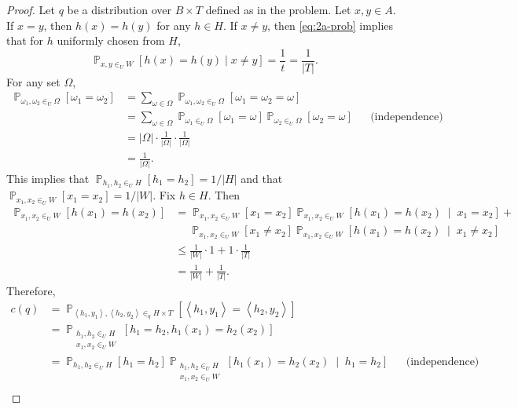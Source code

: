 \documentclass[letterpaper, reqno,11pt]{article}
\newcommand{\PP}{\mathop{{}\mathbb{P}}}
\begin{document}
\begin{enumerate}
\begin{enumerate}
    \begin{proof}
      Let $q$ be a distribution over $B \times T$ defined as in the problem. Let $x, y \in A$. If $x = y$, then $h(x) = h(y)$ for any $h \in H$. If $x \neq y$, then \eqref{eq:2a-prob} implies that for $h$ uniformly chosen from $H$,
      $$ \PP_{x, y \in_U W}[h(x) = h(y) \mid x \neq y] = \frac{1}{t} = \frac{1}{|T|}. $$
      For any set $\Omega$,
      \begin{align*}
        \PP_{\omega_1, \omega_2 \in_U \Omega}\left[\omega_1 = \omega_2\right] &= \sum_{\omega \in \Omega} \PP_{\omega_1, \omega_2 \in_U \Omega}\left[\omega_1 = \omega_2 = \omega\right] \\
        &= \sum_{\omega \in \Omega} \PP_{\omega_1 \in_U \Omega}\left[\omega_1 = \omega\right] \PP_{\omega_2 \in_U \Omega}\left[\omega_2 = \omega\right] && \text{(independence)} \\
        &= |\Omega| \cdot \frac{1}{|\Omega|} \cdot \frac{1}{|\Omega|} \\
        &= \frac{1}{|\Omega|}.
      \end{align*}
      This implies that $\PP_{h_1, h_2 \in_U H}[h_1 = h_2] = 1/|H|$ and that $\PP_{x_1, x_2 \in_U W}[x_1 = x_2] = 1/|W|$. Fix $h \in H$. Then
      \begin{align*}
        \PP_{x_1, x_2 \in_U W}\left[h\left(x_1\right) = h\left(x_2\right)\right] &= \PP_{x_1, x_2 \in_U W}\left[x_1 = x_2\right] \PP_{x_1, x_2 \in_U W}\left[h\left(x_1\right) = h\left(x_2\right) \;\middle|\; x_1 = x_2\right] + \\
        &\quad\; \PP_{x_1, x_2 \in_U W}\left[x_1 \neq x_2\right] \PP_{x_1, x_2 \in_U W}\left[h\left(x_1\right) = h\left(x_2\right) \;\middle|\; x_1 \neq x_2\right] \\
        &\leq \frac{1}{|W|} \cdot 1 + 1 \cdot \frac{1}{|T|} \\
        &= \frac{1}{|W|} + \frac{1}{|T|}.
      \end{align*}
      Therefore,
      \begin{align*}
        c(q) &= \PP_{\left\langle h_1, y_1 \right\rangle, \left\langle h_2, y_2 \right\rangle \in_q H \times T}\left[\left\langle h_1, y_1 \right\rangle = \left\langle h_2, y_2 \right\rangle\right] \\
        &= \PP_{\substack{h_1, h_2 \in_U H \\ x_1, x_2 \in_U W}}\left[h_1 = h_2, h_1\left(x_1\right) = h_2\left(x_2\right)\right] \\
        &= \PP_{h_1, h_2 \in_U H}\left[h_1 = h_2\right] \PP_{\substack{h_1, h_2 \in_U H \\ x_1, x_2 \in_U W}} \left[h_1\left(x_1\right) = h_2\left(x_2\right) \;\middle|\; h_1 = h_2\right] && \text{(independence)} \\

\end{align*}
\end{proof}
\end{enumerate}
\end{enumerate}
\end{document}

